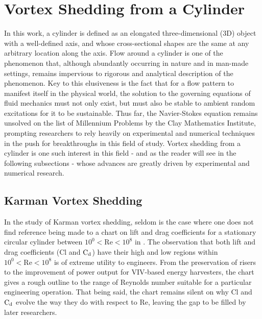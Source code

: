 \documentclass[oneside]{utmthesis}
\begin{document}
\section{Vortex Shedding from a Cylinder}
In this work, a cylinder is defined as an elongated three-dimensional (3D) object with a well-defined axis, and whose cross-sectional shapes are the same at any arbitrary location along the axis. Flow around a cylinder is one of the phenomenon that, although abundantly occurring in nature and in man-made settings, remains impervious to rigorous and analytical description of the phenomenon. Key to this elusiveness is the fact that for a flow pattern to manifest itself in the physical world, the solution to the governing equations of fluid mechanics must not only exist, but must also be stable to ambient random excitations for it to be sustainable. Thus far, the Navier-Stokes equation remains unsolved on the list of Millennium Problems by the Clay Mathematics Institute, prompting researchers to rely heavily on experimental and numerical techniques in the push for breakthroughs in this field of study. Vortex shedding from a cylinder is one such interest in this field - and as the reader will see in the following subsections - whose advances are greatly driven by experimental and numerical research.

\subsection{Karman Vortex Shedding}
In the study of Karman vortex shedding, seldom is the case where one does not find reference being made to a chart on lift and drag coefficients for a stationary circular cylinder between $10^{0} < \text{Re} < 10^{8}$ in \citet{Zdravkovich1997}. The observation that both lift and drag coefficients (Cl and $\text{C}_{\text{d}}$) have their high and low regions within $10^{0} < \text{Re} < 10^{8}$ is of extreme utility to engineers. From the preservation of risers to the improvement of power output for VIV-based energy harvesters, the chart gives a rough outline to the range of Reynolds number suitable for a particular engineering operation. That being said, the chart remains silent on why Cl and $\text{C}_{\text{d}}$ evolve the way they do with respect to Re, leaving the gap to be filled by later researchers.
\end{document}
